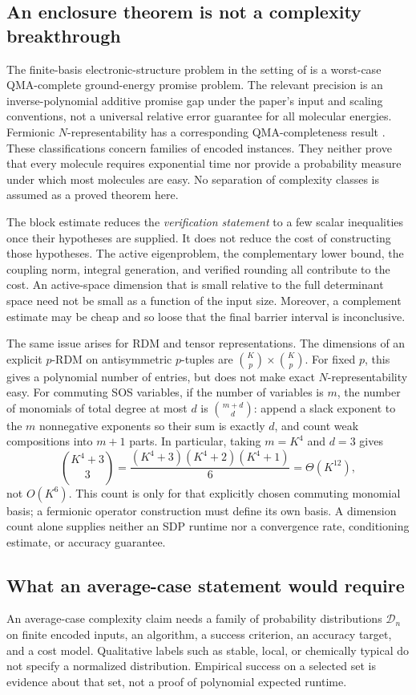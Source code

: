 \subsection{An enclosure theorem is not a complexity breakthrough}
The finite-basis electronic-structure problem in the setting of
\citet{OGorman2022} is a worst-case QMA-complete ground-energy promise
problem. The relevant precision is an inverse-polynomial additive promise
gap under the paper's input and scaling conventions, not a universal relative
error guarantee for all molecular energies. Fermionic $N$-representability
has a corresponding QMA-completeness result \citep{Liu2007}.
These classifications concern families of encoded instances. They neither
prove that every molecule requires exponential time nor provide a probability
measure under which most molecules are easy. No separation of complexity
classes is assumed as a proved theorem here.

The block estimate reduces the \emph{verification statement} to a few scalar
inequalities once their hypotheses are supplied. It does not reduce the cost
of constructing those hypotheses. The active eigenproblem, the complementary
lower bound, the coupling norm, integral generation, and verified rounding all
contribute to the cost. An active-space dimension that is small relative to
the full determinant space need not be small as a function of the input size.
Moreover, a complement estimate may be cheap and so loose that the final
barrier interval is inconclusive.

The same issue arises for RDM and tensor representations. The dimensions of
an explicit $p$-RDM on antisymmetric $p$-tuples are
$\binom Kp\times\binom Kp$. For fixed $p$, this gives a polynomial
number of entries, but does not make exact $N$-representability easy. For
commuting SOS variables, if the number of variables is $m$, the number of
monomials of total degree at most $d$ is $\binom{m+d}{d}$: append a slack
exponent to the $m$ nonnegative exponents so their sum is exactly $d$, and
count weak compositions into $m+1$ parts. In particular, taking $m=K^4$
and $d=3$ gives
\[
 \binom{K^4+3}{3}
 =\frac{(K^4+3)(K^4+2)(K^4+1)}6=\Theta(K^{12}),
\]
not $O(K^6)$. This count is only for that explicitly chosen commuting
monomial basis; a fermionic operator construction must define its own basis.
A dimension count alone supplies neither an SDP runtime nor a convergence
rate, conditioning estimate, or accuracy guarantee.

\subsection{What an average-case statement would require}
An average-case complexity claim needs a family of probability distributions
$\mathcal D_n$ on finite encoded inputs, an algorithm, a success criterion,
an accuracy target, and a cost model. Qualitative labels such as stable,
local, or chemically typical do not specify a normalized distribution.
Empirical success on a selected set is evidence about that set, not a proof
of polynomial expected runtime.

